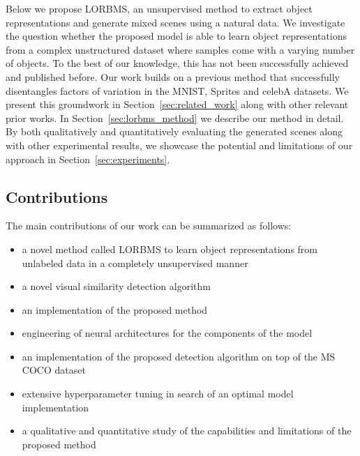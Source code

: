 \documentclass[a4paper,12pt]{report}
\begin{document}
\vspace{5mm}
Below we propose LORBMS, an unsupervised method to extract object representations and generate mixed scenes using a natural data. We investigate the question whether the proposed model is able to learn object representations from a complex unstructured dataset where samples come with a varying number of objects. To the best of our knowledge, this has not been successfully achieved and published before. Our work builds on a previous method that successfully disentangles factors of variation in the MNIST, Sprites and celebA datasets. We present this groundwork in Section~\ref{sec:related_work} along with other relevant prior works. In Section~\ref{sec:lorbms_method} we describe our method in detail. By both qualitatively and quantitatively evaluating the generated scenes along with other experimental results, we showcase the potential and limitations of our approach in Section~\ref{sec:experiments}.  

\subsection{Contributions}
The main contributions of our work can be summarized as follows:
\begin{itemize}
  \item a novel method called LORBMS to learn object representations from unlabeled data in a completely unsupervised manner
  \item a novel visual similarity detection algorithm
  \item an implementation of the proposed method  
  \item engineering of neural architectures for the components of the model
  \item an implementation of the proposed detection algorithm on top of the MS COCO dataset
  \item extensive hyperparameter tuning in search of an optimal model implementation
  \item a qualitative and quantitative study of the capabilities and limitations of the proposed method
\end{itemize}
\end{document}
